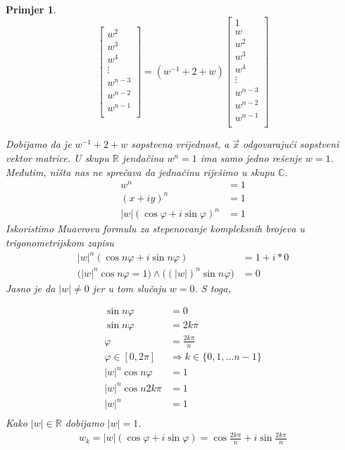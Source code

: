 \documentclass[11pt]{article}
\newtheorem{example}{Primjer}
\begin{document}
\begin{example}
\[\begin{bmatrix}
		w^2      \\
		w^3      \\
		w^4      \\
		\vdots   \\
		w^{n-3}  \\
		w^{n-2}  \\
		w^{n-1}  \\
		\end{bmatrix} 
	= 
	(w^{-1} + 2 + w)
		\begin{bmatrix}
		1      \\
		w        \\
		w^2      \\
		w^3      \\
		w^4      \\
		\vdots   \\
		w^{n-3}  \\
		w^{n-2}  \\
		w^{n-1}  \\
		\end{bmatrix}
	\]
	
	Dobijamo da je $w^{-1} + 2 + w$ sopstvena vrijednost, a $\vec{x}$ odgovarajući sopstveni vektor matrice.
	U skupu $\mathbb{R}$ jendačina $w^n = 1$ ima samo jedno rešenje $w=1$. Međutim, ništa nas ne sprečava 
    da jednačinu riješimo u skupu $\mathbb{C}$.
	\[
	\begin{split}
	w^n  & = 1 \\
	(x + iy)^n & = 1 \\
	|w|(\cos\varphi + i \sin \varphi)^n & = 1
	\end{split}
	\]
	Iskoristimo Muavrovu formulu za stepenovanje kompleksnih brojeva u trigonometrijskom zapisu
	\[
		\begin{split}
			|w|^n (\cos n\varphi + i\sin n\varphi) & = 1 + i * 0 \\
			\big(|w|^n \cos n \varphi = 1 \big) \land \big((|w|)^n \sin n \varphi\big) & = 0  
		\end{split}
		\]
		Jasno je da $|w| \neq 0$ jer u tom slučaju $w=0$. S toga, 
	
	\[
	\begin{split}
		\sin n \varphi &= 0 \\
		\sin n \varphi &= 2 k \pi \\
		\varphi &= \frac{2 k \pi}{n} \\
		\varphi \in [0,2\pi] &\Rightarrow k \in \{0,1, \dots n-1\} \\
		|w|^n \cos n \varphi & = 1 \\
		|w|^n \cos n 2 k \pi & = 1 \\
		|w|^n  & = 1 \\
	\end{split}
	\]
	Kako $|w| \in \mathbb{R}$ dobijamo $|w|=1$.
	\[
	\begin{split}
		w_k = |w| (\cos \varphi + i \sin \varphi) = \cos \frac{2 k \pi}{n} + i \sin \frac{2 k \pi}{n}
	\end{split}
	\]


\end{example}
\end{document}
